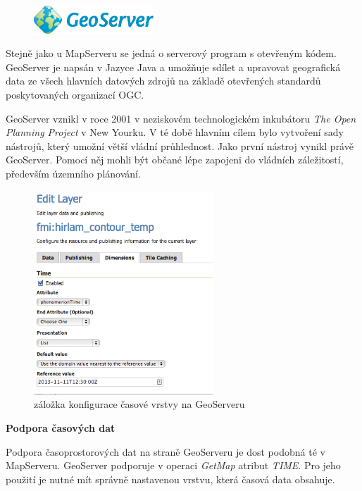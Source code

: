 \begin{figure}[h!]
	\centering
	\includegraphics[width=0.4\textwidth]{../img/geoserver-logo.png}
	\label{fig:geoserver-logo}
\end{figure}
\bigskip

Stejně jako u MapServeru se jedná o serverový program s otevřeným kódem. GeoServer je napsán v Jazyce Java a umožňuje sdílet a upravovat geografická data ze všech hlavních datových zdrojů na základě otevřených standardů poskytovaných organizací OGC. 

GeoServer vznikl v roce 2001 v neziskovém technologickém inkubátoru \textit{The Open Planning Project} v New Yourku. V té době hlavním cílem bylo vytvoření sady nástrojů, který umožní větší vládní průhlednost. Jako první nástroj vynikl právě GeoServer. Pomocí něj mohli být občané lépe zapojeni do vládních záležitostí, především územního plánování.

\begin{figure}[h!]
	\centering
	\includegraphics[width=0.6\textwidth]{../img/geoserver-layer-edit.png}
	\caption{záložka konfigurace časové vrstvy na GeoServeru \cite{geoserver-layer-edit}}
	\label{fig:geoserver-layer-edit}
\end{figure}

\bigskip
\noindent

\textbf{Podpora časových dat}

Podpora časoprostorových dat na straně GeoServeru je dost podobná té v MapServeru. GeoServer podporuje v operaci \textit{GetMap} atribut \textit{TIME}. Pro jeho použití je nutné mít správně nastavenou vrstvu, která časová data obsahuje.

